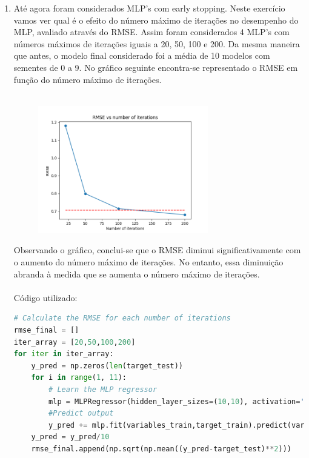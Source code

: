 \documentclass[a4paper,12pt]{article} %
\begin{document}
\begin{enumerate}
\begin{lstlisting}[language=Python]
print('The previous MAE is: ', mae)
print('The new MAE is: ', mae_new)

if mae_new < mae:
    print('The new MAE is lower than the previous one')
elif mae_new > mae:
    print('The new MAE is higher than the previous one')
else:
    print('The new MAE is equal to the previous one')
\end{lstlisting}

\item Até agora foram considerados MLP's com early stopping. Neste exercício vamos
ver qual é o efeito do número máximo de iterações no desempenho do MLP, avaliado através do RMSE.
Assim foram considerados 4 MLP's com números máximos de iterações iguais a 20, 50, 100 e 200. 
Da mesma maneira que antes, o modelo final considerado foi a média de 10 modelos com sementes de 0 a 9. 
No gráfico seguinte encontra-se representado o RMSE em função do número máximo de iterações.\\ \\

\begin{figure}[H]
\centering
\includegraphics[width=0.7\textwidth]{ex3_rmse.png}
\end{figure}

Observando o gráfico, conclui-se que o RMSE diminui significativamente com o aumento do número máximo de iterações.
No entanto, essa diminuição abranda à medida que se aumenta o número máximo de iterações.\\ \\

Código utilizado:

\begin{lstlisting}[language=Python]
# Calculate the RMSE for each number of iterations
rmse_final = []
iter_array = [20,50,100,200]
for iter in iter_array:
    y_pred = np.zeros(len(target_test))
    for i in range(1, 11):
        # Learn the MLP regressor 
        mlp = MLPRegressor(hidden_layer_sizes=(10,10), activation='relu', solver='adam', max_iter = iter, random_state=i)
        #Predict output
        y_pred += mlp.fit(variables_train,target_train).predict(variables_test)
    y_pred = y_pred/10
    rmse_final.append(np.sqrt(np.mean((y_pred-target_test)**2)))


\end{lstlisting}
\end{enumerate}
\end{document}
